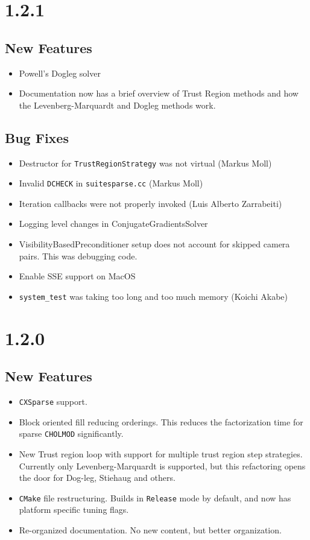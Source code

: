 \section*{1.2.1}
\subsection{New Features}
\begin{itemize}
\item Powell's Dogleg solver
\item Documentation now has a brief overview of Trust Region methods and how the Levenberg-Marquardt and Dogleg methods work.
\end{itemize}
\subsection{Bug Fixes}
\begin{itemize}
\item Destructor for \texttt{TrustRegionStrategy} was not virtual (Markus Moll)
\item Invalid \texttt{DCHECK} in \texttt{suitesparse.cc} (Markus Moll)
\item Iteration callbacks were not properly invoked (Luis Alberto Zarrabeiti)
\item Logging level changes in ConjugateGradientsSolver
\item VisibilityBasedPreconditioner setup does not account for skipped camera pairs. This was debugging code.
\item Enable SSE support on MacOS
\item \texttt{system\_test} was taking too long and too much memory (Koichi Akabe)
\end{itemize}
\section*{1.2.0}
\subsection{New Features}
\begin{itemize}
\item \texttt{CXSparse} support.
\item Block oriented fill reducing orderings. This
reduces the factorization time for sparse
\texttt{CHOLMOD} significantly.
\item New Trust region loop with support for multiple
trust region step strategies. Currently only Levenberg-Marquardt is supported, but this refactoring opens the door for Dog-leg, Stiehaug and others.
\item \texttt{CMake} file restructuring.  Builds in \texttt{Release} mode by default, and now has platform specific tuning flags.
\item Re-organized documentation. No new content, but better organization.
\end{itemize}

